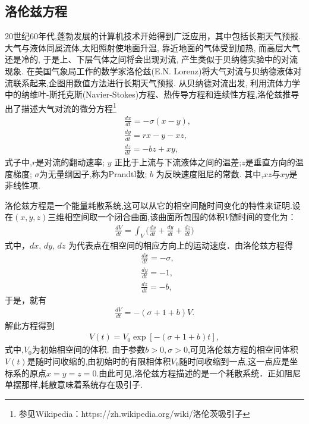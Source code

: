 

\subsection{洛伦兹方程}

20世纪60年代,蓬勃发展的计算机技术开始得到广泛应用，其中包括长期天气预报. 大气与液体同属流体,太阳照射使地面升温, 靠近地面的气体受到加热, 而高层大气还是冷的, 于是上、下层气体之间将会出现对流, 产生类似于贝纳德实验中的对流现象. 在美国气象局工作的数学家洛伦兹(E.N. Lorenz)将大气对流与贝纳德液体对流联系起来,企图用数值方法进行长期天气预报. 从贝纳德对流出发, 利用流体力学中的纳维叶-斯托克斯(Navier-Stokes)方程、热传导方程和连续性方程,洛伦兹推导出了描述大气对流的微分方程\footnote{参见Wikipedia：https://zh.wikipedia.org/wiki/洛伦茨吸引子}
\begin{align}
&\frac{dx}{dt}=-\sigma (x-y),\\
&\frac{dy}{dt}=rx-y-xz,\\
&\frac{dz}{dt}=-bz+xy,
\end{align}
式子中,$r$是对流的翻动速率; $y$ 正比于上流与下流液体之间的温差;$z$是垂直方向的温度梯度; $\sigma$为无量纲因子,称为Prandtl数; $b$ 为反映速度阻尼的常数. 其中,$xz$与$xy$是非线性项.

洛伦兹方程是一个能量耗散系统,这可以从它的相空间随时间变化的特性来证明.设在$(x,y, z)$三维相空间取一个闭合曲面,该曲面所包围的体积$V$随时间的变化为：
\begin{align}
\frac{dV}{dt}=\int_V \Big(\frac{d\dot{x}}{dt}+\frac{d\dot{y}}{dt}+\frac{d\dot{z}}{dt}\Big)
\end{align}
式中，$d\dot{x}$, $d\dot{y}$, $d\dot{z}$ 为代表点在相空间的相应方向上的运动速度．由洛伦兹方程得
\begin{align}
&\frac{d\dot{x}}{dt}=-\sigma,\\
&\frac{d\dot{y}}{dt}=-1,\\
&\frac{d\dot{z}}{dt}=-b,
\end{align}
于是，就有
\begin{align}
\frac{dV}{dt}=-(\sigma+1+b)V.
\end{align}
解此方程得到
\begin{align}
V(t)=V_0\exp[-(\sigma+1+b)t],
\end{align}
式中,$V_0$为初始相空间的体积. 由于参数$b>0,\sigma>0$,可见洛伦兹方程的相空间体积$V(t)$是随时间收缩的,由初始时的有限相体积$V_0$随时间收缩到一点,这一点应是坐标系的原点$x=y=z=0$.由此可见,洛伦兹方程描述的是一个耗散系统．正如阻尼单摆那样,耗散意味着系统存在吸引子.

